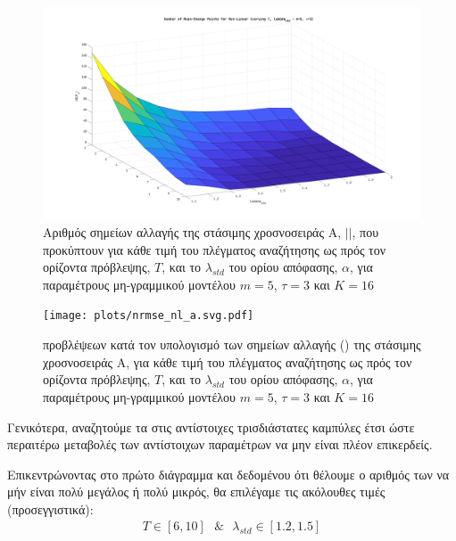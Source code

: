 \begin{figure}[H]
    \begin{center}
        \includegraphics[width=\textwidth]{assets/images/plots/mcps_count_nl_a.svg.pdf}
        \caption{Αριθμός σημείων αλλαγής της στάσιμης χροσνοσειράς Α, $\vert$$\vert$, που προκύπτουν για κάθε τιμή του πλέγματος αναζήτησης ως πρός τον ορίζοντα πρόβλεψης, $T$, και το $\lambda_{std}$ του ορίου απόφασης, $\alpha$, για παραμέτρους μη-γραμμικού μοντέλου $m=5$, $\tau=3$ και $K=16$}
        \label{fig:mcps_count_nl_a}
    \end{center}
\end{figure}

\begin{figure}[H]
    \begin{center}
        \texttt{[image: plots/nrmse\_nl\_a.svg.pdf]}
        \caption{ προβλέψεων κατά τον υπολογισμό των σημείων αλλαγής () της στάσιμης χροσνοσειράς Α, για κάθε τιμή του πλέγματος αναζήτησης ως πρός τον ορίζοντα πρόβλεψης, $T$, και το $\lambda_{std}$ του ορίου απόφασης, $\alpha$, για παραμέτρους μη-γραμμικού μοντέλου $m=5$, $\tau=3$ και $K=16$}
        \label{fig:nrmse_nl_a}
    \end{center}
\end{figure}

\par Γενικότερα, αναζητούμε τα  στις αντίστοιχες τρισδιάστατες καμπύλες έτσι ώστε περαιτέρω μεταβολές των αντίστοιχων παραμέτρων να μην είναι πλέον επικερδείς.

\par Επικεντρώνοντας στο πρώτο διάγραμμα και δεδομένου ότι θέλουμε ο αριθμός των  να μήν είναι πολύ μεγάλος ή πολύ μικρός, θα επιλέγαμε τις ακόλουθες τιμές (προσεγγιστικά):
\begin{align}
    T \in [6,10] \ \ \ \& \ \ \ \lambda_{std} \in [1.2, 1.5]
    \label{eq:t_lambda_mcps_nl_a}
\end{align}

